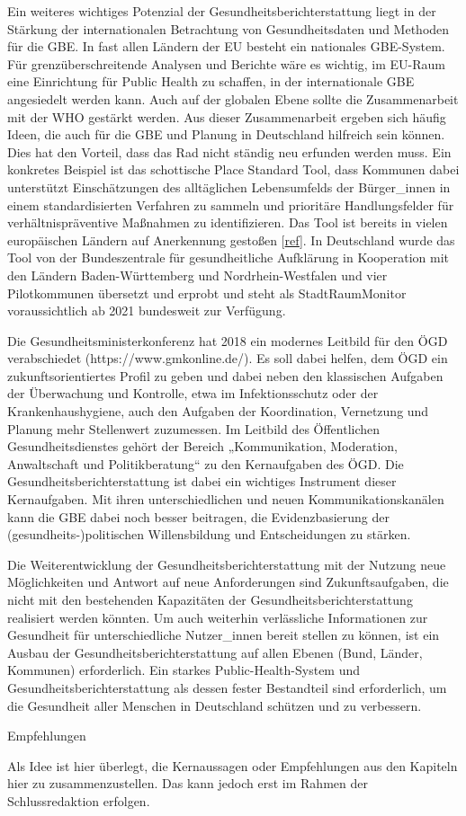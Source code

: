 \documentclass{article}
\begin{document}
Ein weiteres wichtiges Potenzial der Gesundheitsberichterstattung liegt in der Stärkung der internationalen Betrachtung von Gesundheitsdaten und Methoden für die GBE. In fast allen Ländern der EU besteht ein nationales GBE-System. Für grenzüberschreitende  Analysen und Berichte wäre es wichtig, im EU-Raum eine Einrichtung für Public Health zu schaffen, in der internationale GBE angesiedelt werden kann. Auch auf der globalen Ebene sollte die Zusammenarbeit mit der WHO gestärkt werden. Aus dieser Zusammenarbeit ergeben sich häufig Ideen, die auch für die GBE und Planung in Deutschland hilfreich sein können. Dies hat den Vorteil, dass das Rad nicht ständig neu erfunden werden muss. Ein konkretes Beispiel ist das schottische Place Standard Tool, dass Kommunen dabei unterstützt Einschätzungen des alltäglichen Lebensumfelds der Bürger\_innen in einem standardisierten Verfahren zu sammeln und prioritäre Handlungsfelder für verhältnispräventive Maßnahmen zu identifizieren. Das Tool ist bereits in vielen europäischen Ländern auf Anerkennung gestoßen [\href{http://eurohealthnet-magazine.eu/talking-place-a-public-health-conversation-for-everyone/}{ref}]. In Deutschland wurde das Tool von der Bundeszentrale für gesundheitliche Aufklärung in Kooperation mit den Ländern Baden-Württemberg und Nordrhein-Westfalen und vier Pilotkommunen übersetzt und erprobt und steht als StadtRaumMonitor voraussichtlich ab 2021 bundesweit zur Verfügung.


Die Gesundheitsministerkonferenz hat 2018 ein modernes Leitbild für den ÖGD verabschiedet (https://www.gmkonline.de/). Es soll dabei helfen, dem ÖGD ein zukunftsorientiertes Profil zu geben und dabei neben den klassischen Aufgaben der Überwachung und Kontrolle, etwa im Infektionsschutz oder der Krankenhaushygiene, auch den Aufgaben der Koordination, Vernetzung und Planung mehr Stellenwert zuzumessen.  Im Leitbild des Öffentlichen Gesundheitsdienstes\autocite{BVÖGD2018} gehört der Bereich „Kommunikation, Moderation, Anwaltschaft und Politikberatung“ zu den Kernaufgaben des ÖGD. Die Gesundheitsberichterstattung ist dabei ein wichtiges Instrument dieser Kernaufgaben. Mit ihren unterschiedlichen und neuen  Kommunikationskanälen kann die GBE dabei noch besser beitragen, die Evidenzbasierung der (gesundheits-)politischen Willensbildung und Entscheidungen zu stärken.


Die Weiterentwicklung der Gesundheitsberichterstattung mit der Nutzung neue Möglichkeiten und Antwort auf neue Anforderungen sind Zukunftsaufgaben, die nicht mit den bestehenden Kapazitäten der Gesundheitsberichterstattung realisiert werden könnten. Um auch weiterhin verlässliche Informationen zur Gesundheit für unterschiedliche Nutzer\_innen bereit stellen zu können, ist ein Ausbau der Gesundheitsberichterstattung auf allen Ebenen (Bund, Länder, Kommunen) erforderlich. Ein starkes Public-Health-System und Gesundheitsberichterstattung als dessen fester Bestandteil sind erforderlich, um die Gesundheit aller Menschen in Deutschland schützen und zu verbessern. 





Empfehlungen


Als Idee ist hier überlegt, die Kernaussagen oder Empfehlungen aus den Kapiteln hier zu zusammenzustellen. Das kann jedoch erst im Rahmen der Schlussredaktion erfolgen.


\printbibliography[title={Literaturverzeichnis}]
\end{document}
